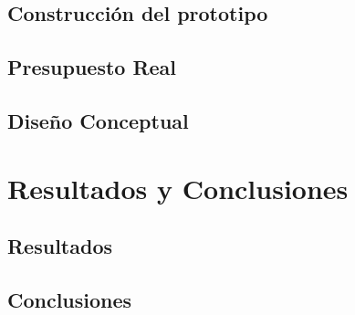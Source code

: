 \documentclass{extbook}
\begin{document}
    \section{Construcción del prototipo}
    \section{Presupuesto Real}
    \section{Diseño Conceptual}



\chapter{Resultados y Conclusiones}
    \section{Resultados}
    \section{Conclusiones}



\end{document}

